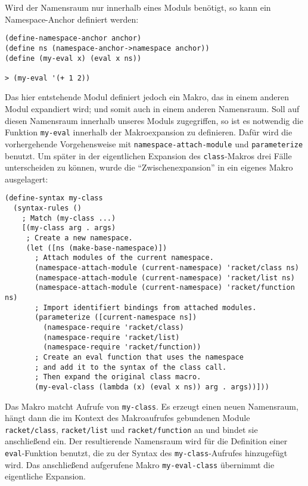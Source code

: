 Wird der Namensraum nur innerhalb eines Moduls benötigt, so kann ein Name\-space-An\-chor definiert werden:

\begin{lstlisting}
(define-namespace-anchor anchor)
(define ns (namespace-anchor->namespace anchor))
(define (my-eval x) (eval x ns))

> (my-eval '(+ 1 2))
\end{lstlisting}
{}

Das hier entstehende Modul definiert jedoch ein Makro, das in einem anderen Modul expandiert wird; und somit auch in einem anderen Namensraum. Soll auf diesen Namensraum innerhalb unseres Moduls zugegriffen, so ist es notwendig die Funktion \texttt{my-eval} innerhalb der Makroexpansion zu definieren. Dafür wird die vorhergehende Vorgehensweise mit \texttt{namespace-attach-module} und \texttt{parameterize} benutzt. Um später in der eigentlichen Expansion des \texttt{class}-Makros drei Fälle unterscheiden zu können, wurde die ``Zwischenexpansion'' in ein eigenes Makro ausgelagert:

\begin{lstlisting}
(define-syntax my-class
  (syntax-rules ()
    ; Match (my-class ...)
    [(my-class arg . args)
     ; Create a new namespace.
     (let ([ns (make-base-namespace)])
       ; Attach modules of the current namespace.
       (namespace-attach-module (current-namespace) 'racket/class ns)
       (namespace-attach-module (current-namespace) 'racket/list ns)
       (namespace-attach-module (current-namespace) 'racket/function ns)
       ; Import identifiert bindings from attached modules.
       (parameterize ([current-namespace ns])
         (namespace-require 'racket/class)
         (namespace-require 'racket/list)
         (namespace-require 'racket/function))
       ; Create an eval function that uses the namespace
       ; and add it to the syntax of the class call.
       ; Then expand the original class macro.
       (my-eval-class (lambda (x) (eval x ns)) arg . args))]))
\end{lstlisting}

Das Makro matcht Aufrufe von \texttt{my-class}. Es erzeugt einen neuen Namensraum, hängt dann die im Kontext des Makroaufrufes gebundenen Module \texttt{racket/class}, \texttt{racket/list} und \texttt{racket/function} an und bindet sie anschließend ein. Der resultierende Namensraum wird für die Definition einer \texttt{eval}-Funktion benutzt, die zu der Syntax des \texttt{my-class}-Aufrufes hinzugefügt wird. Das anschließend aufgerufene Makro \texttt{my-eval-class} übernimmt die eigentliche Expansion.

